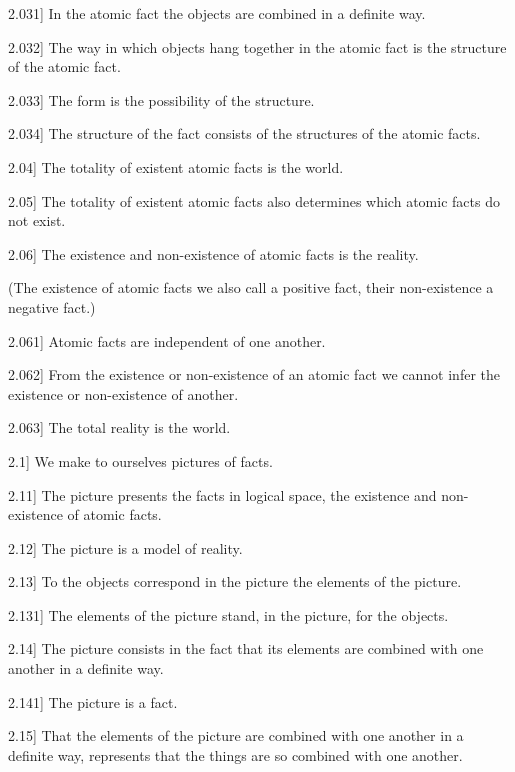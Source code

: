 \documentclass[12pt,oneside]{book}[2007/10/19]
\newcommand{\PropositionE}[2]{%
  \item[\phantomsection\label{PropE:#1}\PropGRef{#1}] #2%
}
\newcommand{\PropGRef}[1]{\hyperref[PropG:#1]{#1}}
\begin{document}
\begin{propositions}
\PropositionE{2.031}
{In the atomic fact the objects are combined in
a definite way.}


\PropositionE{2.032}
{The way in which objects hang together in
the atomic fact is the structure of the atomic
fact.}


\PropositionE{2.033}
{The form is the possibility of the structure.}


\PropositionE{2.034}
{The structure of the fact consists of the structures
of the atomic facts.}


\PropositionE{2.04}
{The totality of existent atomic facts is the
world.}


\PropositionE{2.05}
{The totality of existent atomic facts also determines
which atom\-ic facts do not exist.}


\PropositionE{2.06}
{The existence and non-existence of atomic facts
is the reality.

(The existence of atomic facts we also call
a positive fact, their non-existence a negative
fact.)}


\PropositionE{2.061}
{Atomic facts are independent of one another.}


\PropositionE{2.062}
{From the existence or non-existence of an
atomic fact we cannot infer the existence or non-existence
of another.}


\PropositionE{2.063}
{The total reality is the world.}


\PropositionE{2.1}
{We make to ourselves pictures of facts.}


\PropositionE{2.11}
{The picture presents the facts in logical space,
the existence and non-ex\-is\-tence of atomic
facts.}


\PropositionE{2.12}
{The picture is a model of reality.}


\PropositionE{2.13}
{To the objects correspond in the picture the
elements of the picture.}


\PropositionE{2.131}
{The elements of the picture stand, in the picture,
for the objects.}


\PropositionE{2.14}
{The picture consists in the fact that its elements
are combined with one another in a definite way.}


\PropositionE{2.141}
{The picture is a fact.}


\PropositionE{2.15}
{That the elements of the picture are combined
with one another in a definite way, represents that
\enlargethispage{9pt} %
the things are so combined with one another.

}
\end{propositions}
\end{document}
